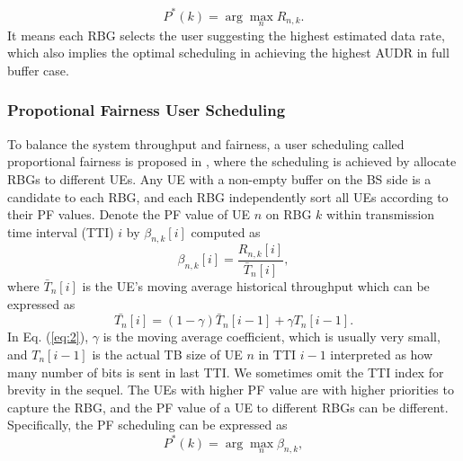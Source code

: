 \documentclass[conference,compsocconf]{IEEEtran}
\begin{document}
\begin{equation}
P^*(k)=\arg\mathop{\max}_{n}R_{n,k}.
\end{equation} 
It means each RBG selects the user suggesting the highest estimated data rate, which also implies the optimal scheduling in achieving the highest AUDR in full buffer case.


\subsubsection{Propotional Fairness User Scheduling}
To balance the system throughput and fairness, a user scheduling called proportional fairness is proposed in \cite{tse2001multiuser}, where the scheduling is achieved by allocate RBGs to different UEs. Any UE with a non-empty buffer on the BS side is a candidate to each RBG, and each RBG independently sort all UEs according to their PF values. Denote the PF value of UE $n$ on RBG $k$ within transmission time interval (TTI) $i$ by $\beta_{n,k}[i]$ computed as
\begin{equation}
\beta_{n,k}[i]=\frac{R_{n,k}[i]}{\bar{T}_n[i]},
\label{eq1}
\end{equation}
where $\bar{T}_n[i]$ is the UE's moving average historical throughput which can be expressed as
\begin{equation}
\bar{T_n}[i]=\left(1-\gamma\right)\bar{T}_n[i-1]+\gamma T_n[i-1].
\label{eq:2}
\end{equation}
In Eq. (\ref{eq:2}), $\gamma$ is the moving average coefficient, which is usually very small, and $T_n[i-1]$ is the actual TB size of UE $n$ in TTI $i-1$ interpreted as how many number of bits is sent in last TTI. We sometimes omit the TTI index for brevity in the sequel. The UEs with higher PF value are with higher priorities to capture the RBG, and the PF value of a UE to different RBGs can be different. Specifically, the PF scheduling can be expressed as
\begin{equation}
P^*(k)=\arg\mathop{\max}_{n}\beta_{n,k},
\end{equation} 
\end{document}

